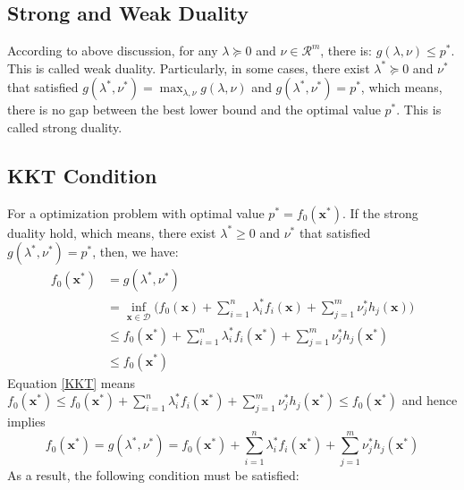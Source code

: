 \documentclass[10pt,a4paper]{article}
\begin{document}
\subsection{Strong and Weak Duality}
According to above discussion, for any $\lambda \succeq 0$ and $\nu \in \mathcal{R}^{m}$, there is: $g(\lambda, \nu) \leq p^{*}$. This is called weak duality. Particularly, in some cases, there exist $\lambda^{*} \succeq 0$ and $\nu^{*}$ that satisfied $g(\lambda^{*}, \nu^{*}) = \displaystyle\max_{\lambda, \nu}g(\lambda, \nu)$ and $g(\lambda^{*}, \nu^{*}) = p^{*}$, which means, there is no gap between the best lower bound and the optimal value $p^{*}$. This is called strong duality.

\subsection{KKT Condition}
For a optimization problem with optimal value $p^{*} = f_{0}(\mathbf{x}^{*})$. If the strong duality hold, which means, there exist $\lambda^{*} \geq 0$ and $\nu^{*}$ that satisfied $g(\lambda^{*}, \nu^{*}) = p^{*}$, then, we have:
\begin{equation}
	\begin{aligned}
		f_{0}(\mathbf{x}^{*}) &= g(\lambda^{*}, \nu^{*}) \\
		&= \displaystyle\inf_{\mathbf{x} \in \mathcal{D}}\Big( f_{0}(\mathbf{x}) + \displaystyle\sum_{i = 1}^{n}\lambda_{i}^{*} f_{i}(\mathbf{x}) + \displaystyle\sum_{j = 1}^{m} \nu_{j}^{*} h_{j}(\mathbf{x}) \Big) \\
		&\leq f_{0}(\mathbf{x}^{*}) + \displaystyle\sum_{i = 1}^{n}\lambda_{i}^{*} f_{i}(\mathbf{x}^{*}) + \displaystyle\sum_{j = 1}^{m} \nu_{j}^{*} h_{j}(\mathbf{x}^{*}) \\
		&\leq f_{0}(\mathbf{x}^{*})
	\end{aligned}
	\label{KKT}
\end{equation}
Equation \ref{KKT} means $f_{0}(\mathbf{x}^{*}) \leq f_{0}(\mathbf{x}^{*}) + \displaystyle\sum_{i = 1}^{n}\lambda_{i}^{*} f_{i}(\mathbf{x}^{*}) + \displaystyle\sum_{j = 1}^{m} \nu_{j}^{*} h_{j}(\mathbf{x}^{*}) \leq f_{0}(\mathbf{x}^{*})$ and hence implies
\begin{equation}
	f_{0}(\mathbf{x}^{*}) = g(\lambda^{*}, \nu^{*}) = f_{0}(\mathbf{x}^{*}) + \displaystyle\sum_{i = 1}^{n}\lambda_{i}^{*} f_{i}(\mathbf{x}^{*}) + \displaystyle\sum_{j = 1}^{m} \nu_{j}^{*} h_{j}(\mathbf{x}^{*})
	\label{KKT_2}
\end{equation}
As a result, the following condition must be satisfied:
\end{document}

